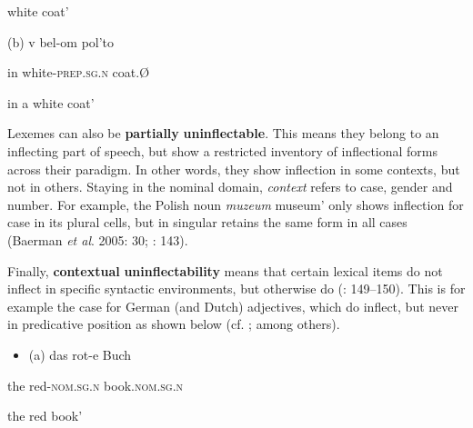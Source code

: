 \documentclass[output=paper]{langscibook}
\begin{document}
\begin{styleBeispielCinqueKapitel}
{\textasciigrave}white coat’
\end{styleBeispielCinqueKapitel}

\begin{styleBeispielCinqueKapitel}
(b) v bel-om pol’to
\end{styleBeispielCinqueKapitel}

\begin{styleBeispielCinqueKapitel}
in white-\textsc{prep.sg.n} coat.Ø
\end{styleBeispielCinqueKapitel}

\begin{styleBeispielCinqueKapitel}
{\textasciigrave}in a white coat’
\end{styleBeispielCinqueKapitel}

Lexemes can also be \textbf{partially} \textbf{uninflectable}. This means they belong to an inflecting part of speech, but show a restricted inventory of inflectional forms across their paradigm. In other words, they show inflection in some contexts, but not in others. Staying in the nominal domain, \textit{context} refers to case, gender and number. For example, the Polish noun \textit{muzeum} {\textasciigrave}museum’ only shows inflection for case in its plural cells, but in singular retains the same form in all cases (Baerman \textit{et al}. 2005: 30; \citealt{Spencer2020}: 143).

Finally, \textbf{contextual} \textbf{uninflectability} means that certain lexical items do not inflect in specific syntactic environments, but otherwise do (\citealt{Spencer2020}: 149\-–150). This is for example the case for German (and Dutch) adjectives, which do inflect, but never in predicative position as shown below (cf. \citealt{Roehrs2008}; \citealt{Zeijlstra2020} among others).

\begin{itemize}
\item \begin{styleBeispielCinqueKapitel}
(a) das rot-e Buch
\end{styleBeispielCinqueKapitel}
\end{itemize}
\begin{styleBeispielCinqueKapitel}
the red-\textsc{nom.sg.n} book.\textsc{nom.sg.n}
\end{styleBeispielCinqueKapitel}

\begin{styleBeispielCinqueKapitel}
{\textasciigrave}the red book’
\end{styleBeispielCinqueKapitel}
\end{document}
